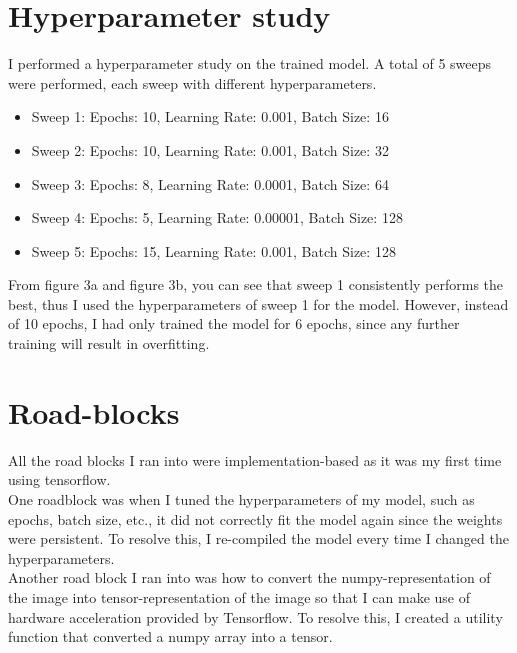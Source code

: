 \documentclass[acmtog]{acmart}
\begin{document}
	\section{Hyperparameter study}
	I performed a hyperparameter study on the trained model. A total of 5 sweeps were performed, each sweep with different hyperparameters.
	\begin{itemize}
		\item Sweep 1: Epochs: 10, Learning Rate: 0.001, Batch Size: 16
		\item Sweep 2: Epochs: 10, Learning Rate: 0.001, Batch Size: 32
		\item Sweep 3: Epochs: 8, Learning Rate: 0.0001, Batch Size: 64
		\item Sweep 4: Epochs: 5, Learning Rate: 0.00001, Batch Size: 128
		\item Sweep 5: Epochs: 15, Learning Rate: 0.001, Batch Size: 128
	\end{itemize}
	From figure 3a and figure 3b, you can see that sweep 1 consistently performs the best, thus I used the hyperparameters of sweep 1 for the model. However, instead of 10 epochs, I had only trained the model for 6 epochs, since any further training will result in overfitting.
	
	\section{Road-blocks}
	All the road blocks I ran into were implementation-based as it was my first time using tensorflow.\\
	One roadblock was when I tuned the hyperparameters of my model, such as epochs, batch size, etc., it did not correctly fit the model again since the weights were persistent. To resolve this, I re-compiled the model every time I changed the hyperparameters.
	\\
	Another road block I ran into was how to convert the numpy-representation of the image into tensor-representation of the image so that I can make use of hardware acceleration provided by Tensorflow. To resolve this, I created a utility function that converted a numpy array into a tensor.
	
	
	
\end{document}
